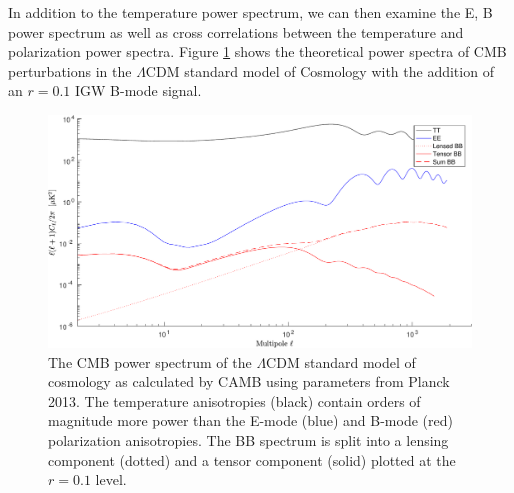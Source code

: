 \documentclass[12pt]{article}
\begin{document}
In addition to the temperature power spectrum, we can then examine the
E, B power spectrum as well as cross correlations between the temperature and
polarization power spectra. Figure \ref{fig:theory_aps} shows the
theoretical power spectra of CMB perturbations in the $\Lambda$CDM standard
model of Cosmology with the addition of an $r=0.1$ IGW B-mode signal. 



\begin{figure}
	\center
	\includegraphics[width=.8\textwidth]{theory_aps.pdf}
	\caption{The CMB power spectrum of the $\Lambda$CDM standard model of
	cosmology as calculated by CAMB using parameters from Planck 2013. The
	temperature anisotropies (black) contain orders of magnitude more power
	than the E-mode (blue) and B-mode (red) polarization anisotropies. The BB
	spectrum is split into a lensing component (dotted) and a tensor component
	(solid) plotted at the $r=0.1$ level.}
	\label{fig:theory_aps}

\end{figure}
\end{document}

